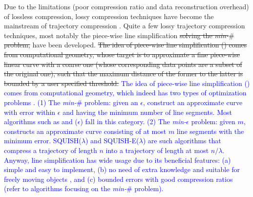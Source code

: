 Due to the  limitations (poor compression ratio and data reconstruction overhead) of lossless compression, lossy compression techniques have become the mainstream of trajectory compression \cite{Lin:Operb,Zhang:Evaluation}. Quite a few lossy trajectory compression techniques, most notably the piece-wise line simplification \cite{Douglas:Peucker, Hershberger:Speeding, Keogh:online,Liu:BQS, Muckell:Compression, Chen:Trajectory, Chen:Fast, Cao:Spatio, Shi:Survey} \sout{solving the \emph{min-$\#$} problem,} have been developed. 
\sout{The idea of piece-wise line simplification (\lsa) comes from computational geometry, whose target is to approximate a fine piece-wise linear curve with a coarse one (whose corresponding data points are a subset of the original one), such that the maximum distance of the former to the latter is bounded by a user specified threshold. }
%
\textcolor{blue}{The idea of piece-wise line simplification (\lsa) comes from computational geometry, which indeed has two types of optimization problems \cite{Chan:Optimal, Imai:Optimal,Pavlidis:Segment}. (1) The \emph{min-$\#$} problem: given an $\epsilon$, construct an approximate curve with error within $\epsilon$ and having the minimum number of line segments. Most \lsa algorithms such as \cite{Douglas:Peucker, Hershberger:Speeding, Keogh:online,Liu:BQS, Chen:Trajectory, Chen:Fast, Cao:Spatio, Shi:Survey} and \squishe($\epsilon$) \cite{Muckell:Compression} fall in this category.} 
\textcolor{blue}{(2) The \emph{min-$\epsilon$} problem: given $m$, constructs an approximate curve consisting of at most $m$ line segments with the minimum error. SQUISH($\lambda$) \cite{Muckell:SQUISH} and SQUISH-E($\lambda$) \cite{Muckell:Compression} are such algorithms that compress a trajectory of length $n$ into a trajectory of length at most $n/\lambda$. }
\textcolor{blue}{Anyway, line simplification has wide usage due to its beneficial features: (a) simple and easy to implement, (b) no need of extra knowledge and suitable for freely  moving  objects \cite{Popa:Spatio}, and (c) bounded errors with good compression ratios (refer to algorithms focusing on the \emph{min-$\#$} problem). }


